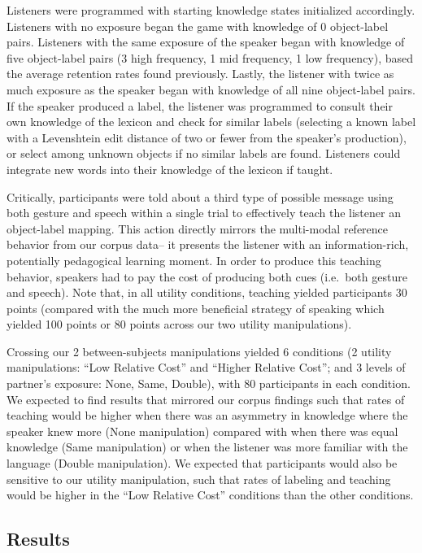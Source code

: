 \documentclass[english,,man,floatsintext]{apa6}
\begin{document}
Listeners were programmed with starting knowledge states initialized accordingly. Listeners with no exposure began the game with knowledge of 0 object-label pairs. Listeners with the same exposure of the speaker began with knowledge of five object-label pairs (3 high frequency, 1 mid frequency, 1 low frequency), based the average retention rates found previously. Lastly, the listener with twice as much exposure as the speaker began with knowledge of all nine object-label pairs. If the speaker produced a label, the listener was programmed to consult their own knowledge of the lexicon and check for similar labels (selecting a known label with a Levenshtein edit distance of two or fewer from the speaker's production), or select among unknown objects if no similar labels are found. Listeners could integrate new words into their knowledge of the lexicon if taught.

Critically, participants were told about a third type of possible message using both gesture and speech within a single trial to effectively teach the listener an object-label mapping. This action directly mirrors the multi-modal reference behavior from our corpus data-- it presents the listener with an information-rich, potentially pedagogical learning moment. In order to produce this teaching behavior, speakers had to pay the cost of producing both cues (i.e.~both gesture and speech). Note that, in all utility conditions, teaching yielded participants 30 points (compared with the much more beneficial strategy of speaking which yielded 100 points or 80 points across our two utility manipulations).

Crossing our 2 between-subjects manipulations yielded 6 conditions (2 utility manipulations: \enquote{Low Relative Cost} and \enquote{Higher Relative Cost}; and 3 levels of partner's exposure: None, Same, Double), with 80 participants in each condition. We expected to find results that mirrored our corpus findings such that rates of teaching would be higher when there was an asymmetry in knowledge where the speaker knew more (None manipulation) compared with when there was equal knowledge (Same manipulation) or when the listener was more familiar with the language (Double manipulation). We expected that participants would also be sensitive to our utility manipulation, such that rates of labeling and teaching would be higher in the \enquote{Low Relative Cost} conditions than the other conditions.

\hypertarget{results-2}{%
\subsection{Results}\label{results-2}}
\end{document}
